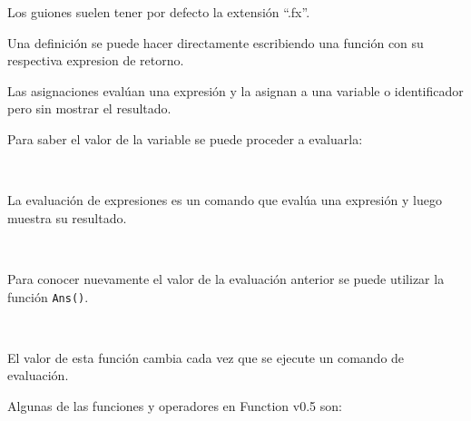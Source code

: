       Los guiones suelen tener por defecto la extensión ``.fx''.
      
      Una definición se puede hacer directamente escribiendo una función con su respectiva expresion de retorno.
      
      \begin{fxcode}
      \end{fxcode}
      
      Las asignaciones evalúan una expresión y la asignan a una variable o identificador pero sin mostrar el resultado.
      
      \begin{fxcode}
      \end{fxcode}
      
      Para saber el valor de la variable se puede proceder a evaluarla:
      
      \begin{fxcode}
         \\
      \end{fxcode}
      
      La evaluación de expresiones es un comando que evalúa una expresión y luego muestra su resultado.
      
      \begin{fxcode}
         \\
      \end{fxcode}
      
      Para conocer nuevamente el valor de la evaluación anterior se puede utilizar la función \texttt{Ans()}.
      
      \begin{fxcode}
         \\
      \end{fxcode}
      
      El valor de esta función cambia cada vez que se ejecute un comando de evaluación.
      
      Algunas de las funciones y operadores en Function v0.5 son:
      
